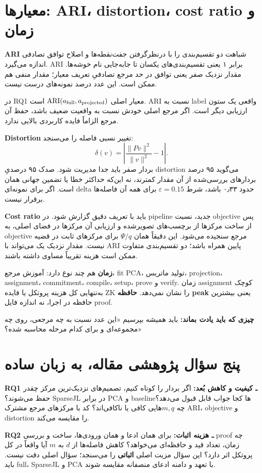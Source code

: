\documentclass[11pt,a4paper]{article}
\newcommand{\lesson}[1]{\clearpage\section{#1}}
\newcommand{\takeaway}[1]{\par\textbf{چیزی که باید یادت بماند:} #1\par}
\begin{document}
\lesson{معیارها: ARI، distortion، cost ratio و زمان}
\textbf{ARI} شباهت دو تقسیم‌بندی را با درنظرگرفتن جفت‌نقطه‌ها و اصلاح توافق تصادفی اندازه می‌گیرد. ARI برابر ۱ یعنی تقسیم‌بندی‌های یکسان تا جابه‌جایی نام خوشه‌ها. مقدار نزدیک صفر یعنی توافق در حد مرجع تصادفیِ تعریف معیار؛ مقدار منفی هم ممکن است. این عدد درصد نمونه‌های درست نیست.

در RQ1 معیار اصلی \(\operatorname{ARI}(a_{\rm full},a_{\rm projected})\) است. ARI نسبت به label واقعی یک ستون ارزیابی دیگر است. اگر مرجع اصلی خودش نسبت به واقعیت ضعیف باشد، حفظ آن مرجع الزاماً فایده کاربردی بالایی ندارد.

\textbf{Distortion} تغییر نسبی فاصله را می‌سنجد:
\[
 \delta(v)=\left|\frac{\|Pv\|^2}{\|v\|^2}-1\right|.
\]
بردار صفر باید جدا مدیریت شود. صدک ۹۵ درصدیِ distortion می‌گوید ۹۵ درصد بردارهای بررسی‌شده از آن مقدار کمترند، نه این‌که حداکثر خطا یا تضمین جهانی همان است. اگر برای نمونه‌ای delta حدود ۰٫۳۳ باشد، شرط \(\varepsilon=0.15\) برای همه آن فاصله‌ها برقرار نیست.

\textbf{Cost ratio} باید با تعریف دقیق گزارش شود. در pipeline جدید، نسبت objective پس از ساخت مرکزها از برچسب‌های تصویرشده و ارزیابی آن مرکزها در فضای اصلی، به objective مرجع سنجیده می‌شود. این دقیقاً همان \(\Psi/q\) برای مرکزهای ثابت در قضیه نیست. مقدار نزدیک یک می‌تواند با ARI پایین همراه باشد؛ دو تقسیم‌بندی متفاوت ممکن است هزینه تقریباً مساوی داشته باشند.

\textbf{زمان} هم چند نوع دارد: آموزش مرجع، fit PCA، تولید ماتریس، projection، assignment، commitment، compile، setup، prove و verify. زمان assignment کوچک به‌تنهایی کل هزینه پروتکل یا فایده ZK را نشان نمی‌دهد. \textbf{حافظه peak} یعنی بیشترین حافظه در اجرا، نه اندازه فایل proof.

\takeaway{باید همیشه بپرسیم «این عدد نسبت به چه مرجعی، روی چه مجموعه‌ای و برای کدام مرحله محاسبه شده؟»}

\lesson{پنج سؤال پژوهشی مقاله، به زبان ساده}
\textbf{RQ1 ـ کیفیت و کاهش بُعد:} اگر بردار را کوتاه کنیم، تصمیم‌های نزدیک‌ترین مرکز چقدر حفظ می‌شوند؟ SparseJL در برابر PCA و baselineها کجا جواب قابل قبول می‌دهد؟ چه \(m,q\)هایی کافی یا ناکافی‌اند؟ کد با مرکزهای مرجع مشترک ARI، objective و distortion را مقایسه می‌کند.

\textbf{RQ2 ـ هزینه اثبات:} برای همان ادعا و همان ورودی‌ها، ساخت و بررسی proof چه زمان، تعداد قید و حافظه‌ای می‌خواهد؟ کاهش فاصله‌ها از \(d\) به \(m\) آیا واقعاً در کل پروتکل اثر دارد؟ این سؤال مزیت اصلی \textbf{اثباتی} را می‌سنجد؛ سؤال اصلی دقت نیست. باید full، SparseJL و PCA با تعهد و دامنه ادعای منصفانه مقایسه شوند.
\end{document}
